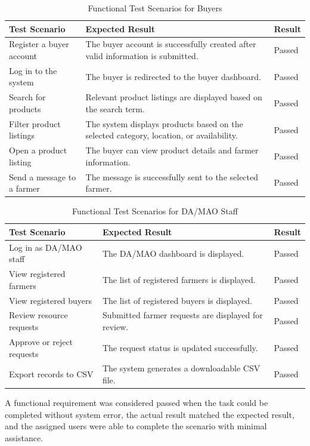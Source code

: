 \begin{table}[H]
\centering
\caption{Functional Test Scenarios for Buyers}
\begin{tabular}{p{4cm}p{6cm}p{3cm}}
\hline
\textbf{Test Scenario} & \textbf{Expected Result} & \textbf{Result} \\
\hline
Register a buyer account & The buyer account is successfully created after valid information is submitted. & Passed \\
Log in to the system & The buyer is redirected to the buyer dashboard. & Passed \\
Search for products & Relevant product listings are displayed based on the search term. & Passed \\
Filter product listings & The system displays products based on the selected category, location, or availability. & Passed \\
Open a product listing & The buyer can view product details and farmer information. & Passed \\
Send a message to a farmer & The message is successfully sent to the selected farmer. & Passed \\
\hline
\end{tabular}
\end{table}

\begin{table}[H]
\centering
\caption{Functional Test Scenarios for DA/MAO Staff}
\begin{tabular}{p{4cm}p{6cm}p{3cm}}
\hline
\textbf{Test Scenario} & \textbf{Expected Result} & \textbf{Result} \\
\hline
Log in as DA/MAO staff & The DA/MAO dashboard is displayed. & Passed \\
View registered farmers & The list of registered farmers is displayed. & Passed \\
View registered buyers & The list of registered buyers is displayed. & Passed \\
Review resource requests & Submitted farmer requests are displayed for review. & Passed \\
Approve or reject requests & The request status is updated successfully. & Passed \\
Export records to CSV & The system generates a downloadable CSV file. & Passed \\
\hline
\end{tabular}
\end{table}

A functional requirement was considered passed when the task could be completed without system error, the actual result matched the expected result, and the assigned users were able to complete the scenario with minimal assistance.


